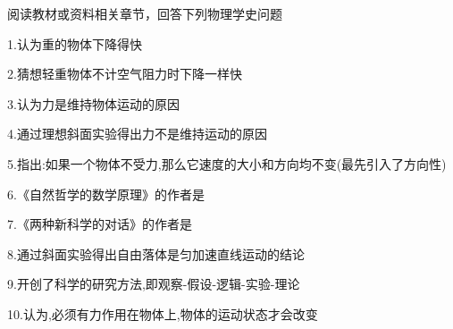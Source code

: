 阅读教材或资料相关章节，回答下列物理学史问题

	1.\lunl{4em}认为重的物体下降得快

	2.\lunl{4em}猜想轻重物体不计空气阻力时下降一样快

	3.\lunl{4em}认为力是维持物体运动的原因

	4.\lunl{4em}通过理想斜面实验得出力不是维持运动的原因

	5.\lunl{4em}指出:如果一个物体不受力,那么它速度的大小和方向均不变(最先引入了方向性)

	6.《自然哲学的数学原理》的作者是\lunl{4em}

	7.《两种新科学的对话》的作者是\lunl{4em}

	8.\lunl{4em}通过斜面实验得出自由落体是匀加速直线运动的结论

	9.\lunl{4em}开创了科学的研究方法,即观察-假设-逻辑-实验-理论

	10.\lunl{4em}认为,必须有力作用在物体上,物体的运动状态才会改变